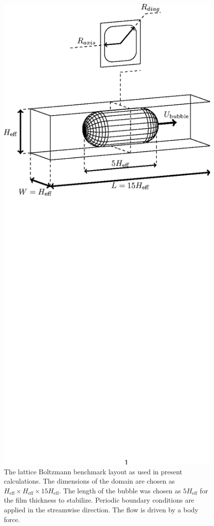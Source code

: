 \documentclass{article}
\begin{document}
\begin{figure}[ht]
\includegraphics*[bb=152 470 410 713,width=\textwidth]{Figures/benchmark_lbm.eps}
\caption{The lattice Boltzmann benchmark layout as used in present calculations. The dimensions of
the domain are chosen as $H_{\mathrm{eff}}\times H_{\mathrm{eff}}\times 15 H_{\mathrm{eff}}$. The
length of the bubble was chosen as $5 H_{\mathrm{eff}}$ for the film thickness to stabilize.
Periodic boundary conditions are applied in the streamwise direction. The flow is driven by a body
force. \label{fig:lbm:benchmark}}
\end{figure}
\end{document}
